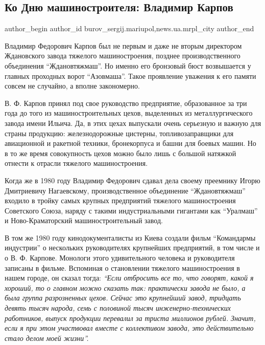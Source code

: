  
 
 
 
 
 
\subsection{Ко Дню машиностроителя: Владимир Карпов}
\label{sec:22_09_2018.stz.news.ua.mrpl_city.1.ko_dnju_mashinostroenia_vladimir_karpov}
 
\ifcmt
 author_begin
   author_id burov_sergij.mariupol,news.ua.mrpl_city
 author_end
\fi


Владимир Федорович Карпов был не первым и даже не вторым директором Ждановского
завода тяжелого машиностроения, позднее производственного объединения
\enquote{Ждановтяжмаш}. Но именно его бронзовый бюст возвышается у главных проходных
ворот \enquote{Азовмаша}. Такое проявление уважения к его памяти совсем не случайно, а
вполне закономерно.

В. Ф. Карпов принял под свое руководство предприятие, образованное за три года до
того из машиностроительных цехов, выделенных из металлургического завода имени
Ильича. Да, в этих цехах выпускали очень серьезную и важную для страны
продукцию: железнодорожные  цистерны, топливозаправщики для авиационной и
ракетной техники, бронекорпуса и башни для боевых машин. Но в то же время
совокупность цехов можно было лишь с большой натяжкой отнести к отрасли
тяжелого машиностроения.

Когда же в 1980 году Владимир Федорович сдавал дела своему преемнику Игорю
Дмитриевичу Нагаевскому, производственное объединение \enquote{Ждановтяжмаш} входило в
тройку самых крупных предприятий тяжелого машиностроения Советского Союза,
наряду с такими  индустриальными гигантами как \enquote{Уралмаш} и Ново-Краматорский
машиностроительный завод. 


В том же 1980 году кинодокументалисты из Киева создали фильм
\enquote{Командармы индустрии} о нескольких руководителях крупнейших
предприятий, в том числе и о В. Ф. Карпове. Монологи этого удивительного
человека и руководителя записаны в фильме. Вспоминая о становлении тяжелого
машиностроения в нашем городе, он сказал тогда: \emph{\enquote{Если отбросить
все то, что говорят, какой я хороший, то о главном можно сказать так:
практически завода не было, а была группа разрозненных цехов. Сейчас это
крупнейший завод, тридцать девять тысяч народа, семь с половиной тысяч
инженерно-технических работников, выпуск продукции перевалил за триста
миллионов рублей. Значит, если я при этом участвовал вместе с коллективом
завода, это действительно стало делом моей жизни}.}

